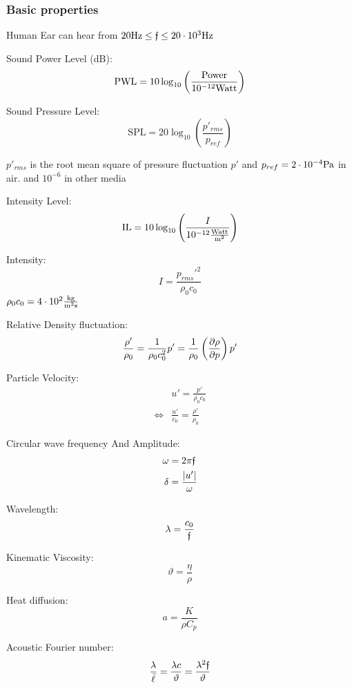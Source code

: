 \documentclass[main.tex]{subfiles}
\begin{document}
\subsubsection{Basic properties}
Human Ear can hear from $20 \text{Hz} \leq \mathfrak{f} \leq 20\cdot 10^{3} \text{Hz}$

Sound Power Level (dB):
\begin{equation}
    \text{PWL} = 10\log_{10}\left(\frac{\text{Power}}{10^{-12}\text{Watt}}\right)
    \label{eq:PWL}
\end{equation}

Sound Pressure Level:
\begin{equation}
    \text{SPL} = 20\log_{10}\left(\frac{p'_{rms}}{p_{ref}}\right)
    \label{eq:SPL}  
\end{equation}

$p'_{rms}$ is the root mean square of pressure fluctuation $p'$ and $p_{ref} = 2\cdot 10^{-4}\text{Pa}$ in air. and $10^{-6}$ in other media

Intensity Level:
\begin{equation}
    \text{IL} = 10\log_{10}\left(\frac{I}{10^{-12}\frac{\text{Watt}}{\text{m}^2}}\right) 
    \label{eq:IL}
\end{equation}

Intensity:
\begin{equation}
    I = \frac{p_{rms}'^2}{\rho_0c_0}
    \label{eq:Intesity}
\end{equation}
$\rho_0 c_0 = 4\cdot 10^{2}\frac{\text{kg}}{\text{m}^2 \text{s}}$ 

Relative Density fluctuation:
\begin{equation}
    \frac{\rho'}{\rho_0} = \frac{1}{\rho_0 c_0^2}p' = \frac{1}{\rho_0}\left(\frac{\partial \rho}{\partial p}\right)p'
    \label{eq: Density fluctuation}
\end{equation}

Particle Velocity:
\begin{align}
    &u' = \frac{p'}{\rho_0 c_0} \label{eq:part_velo}\\
    \iff &\frac{u'}{c_0} = \frac{\rho'}{\rho_0} \nonumber
\end{align}

Circular wave frequency And Amplitude:
\begin{align}
    \omega &= 2\pi \mathfrak{f} \label{eq:circ_freq}\\
    \delta &= \frac{|u'|}{\omega} \label{eq:amplitude}
\end{align}

Wavelength:
\begin{equation}
    \lambda = \frac{c_0}{\mathfrak{f}}
    \label{eq:wavelen}
\end{equation}

Kinematic Viscosity:
\begin{equation}
    \vartheta = \frac{\eta}{\rho} \label{}
\end{equation}

Heat diffusion:
\begin{equation}
    a = \frac{K}{\rho C_p}
    \label{eq:Heat_diff}
\end{equation}

Acoustic Fourier number:
\begin{equation}
    \frac{\lambda}{\Bar{\ell}} = \frac{\lambda c}{\vartheta} = \frac{\lambda^2 \mathfrak{f}}{\vartheta}
\end{equation}
\end{document}
